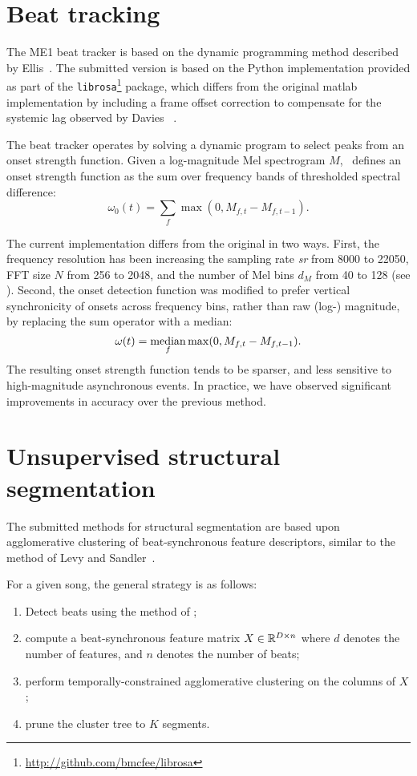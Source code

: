 \documentclass{article}
\begin{document}
\section{Beat tracking}

The ME1 beat tracker is based on the dynamic programming method described by Ellis~\cite{ellis2007beat}.
The submitted version is based on the Python implementation provided as part of the {\tt librosa}\footnote{\url{http://github.com/bmcfee/librosa}} package, 
which differs from the original matlab implementation by including a frame offset
correction to compensate for the systemic lag observed by Davies \etal~\cite{davies2009evaluation}.

The beat tracker operates by solving a dynamic program to select peaks from an onset strength function.  
Given a log-magnitude Mel spectrogram $M$,~\cite{ellis2007beat} defines an onset strength function as the sum over
frequency bands of thresholded spectral difference:
\[
\omega_0(t) = \sum_f \max(0, M_{f, t} - M_{f, t-1}).
\]

The current implementation differs from the original in two ways.  First, the frequency resolution has been
increasing the sampling rate {\em sr} from 8000 to 22050, FFT size $N$ from 256 to 2048, and the number of Mel bins
$d_M$ from 40 to 128 (see ).  Second, the onset detection function was modified to prefer
vertical synchronicity of onsets across frequency bins, rather than raw (log-) magnitude, by replacing the sum operator
with a median:
\[
\omega(t) = \operatorname*{median}_f \max(0, M_{f,t} - M_{f, t-1}).
\]
The resulting onset strength function tends to be sparser, and less sensitive to high-magnitude asynchronous
events.  In practice, we have observed significant improvements in accuracy over the previous method.

\label{sec:beats}

\section{Unsupervised structural segmentation}

The submitted methods for structural segmentation are based upon agglomerative clustering of beat-synchronous
feature descriptors, similar to the method of Levy and Sandler~\cite{levy2008structural}.

For a given song, the general strategy is as follows:
\begin{enumerate}
\item Detect beats using the method of ;
\item compute a beat-synchronous feature matrix $X \in \mathbb{R}^{D\times n}$ where $d$ denotes the number of features,
and $n$ denotes the number of beats;
\item perform temporally-constrained agglomerative clustering on the columns of $X$;
\item prune the cluster tree to $K$ segments.
\end{enumerate}
\end{document}
